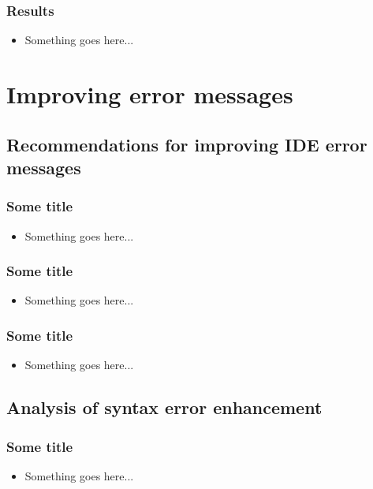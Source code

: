 \documentclass{beamer}
\begin{document}
\begin{frame}
	\frametitle{Results}
		\begin{itemize}
			\item Something goes here...
		\end{itemize}

\end{frame}

\section[Improving error messages]{Improving error messages}

\subsection[DrRacket recommendations]{Recommendations for improving IDE error messages}

\begin{frame}
	\frametitle{Some title}
		\begin{itemize}
			\item Something goes here...
		\end{itemize}

\end{frame}

\begin{frame}
	\frametitle{Some title}
		\begin{itemize}
			\item Something goes here...
		\end{itemize}

\end{frame}

\begin{frame}
	\frametitle{Some title}
		\begin{itemize}
			\item Something goes here...
		\end{itemize}

\end{frame}

\subsection[Syntax error enhancement]{Analysis of syntax error enhancement}

\begin{frame}
	\frametitle{Some title}
		\begin{itemize}
			\item Something goes here...
		\end{itemize}

\end{frame}
\end{document}
